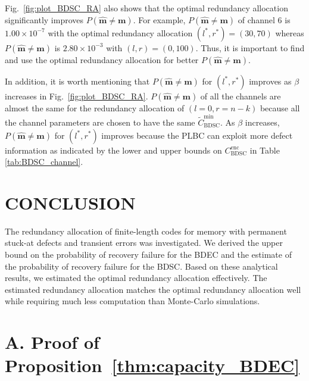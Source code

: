 \documentclass[10pt,twocolumn,twoside,submit]{JCNtran}
\begin{document}
	Fig.~\ref{fig:plot_BDSC_RA} also shows that the optimal redundancy allocation significantly improves $P\left( \widehat{\mathbf{m}} \ne \mathbf{m} \right)$. For example, $P\left( \widehat{\mathbf{m}} \ne \mathbf{m} \right)$ of channel 6 is $1.00 \times 10^{-7}$ with the optimal redundancy allocation $(l^*, r^*) = (30, 70)$ whereas $P\left( \widehat{\mathbf{m}} \ne \mathbf{m} \right)$ is $2.80 \times 10^{-3}$ with $(l, r) = (0, 100)$. Thus, it is important to find and use the optimal redundancy allocation for better $P\left( \widehat{\mathbf{m}} \ne \mathbf{m} \right)$.
	
	In addition, it is worth mentioning that $P\left( \widehat{\mathbf{m}} \ne \mathbf{m} \right)$ for $(l^*, r^*)$ improves as $\beta$ increases in Fig.~\ref{fig:plot_BDSC_RA}. $P\left( \widehat{\mathbf{m}} \ne \mathbf{m} \right)$ of all the channels are almost the same for the redundancy allocation of $\left(l=0, r=n-k\right)$ because all the channel parameters are chosen to have the same $\widetilde{C}_{\text{BDSC}}^{\text{min}}$. As $\beta$ increases, $P\left( \widehat{\mathbf{m}} \ne \mathbf{m} \right)$ for $(l^*, r^*)$ improves because the PLBC can exploit more defect information as indicated by the lower and upper bounds on $C_{\text{BDSC}}^{\text{enc}}$ in Table \ref{tab:BDSC_channel}. 

\section{\uppercase{Conclusion}} \label{sec:conclusion}

	The redundancy allocation of finite-length codes for memory with permanent stuck-at defects and transient errors was investigated. We derived the upper bound on the probability of recovery failure for the BDEC and the estimate of the probability of recovery failure for the BDSC. Based on these analytical results, we estimated the optimal redundancy allocation effectively. The estimated redundancy allocation matches the optimal redundancy allocation well while requiring much less computation than Monte-Carlo simulations.

\appendices

\section*{A. Proof of Proposition~\ref{thm:capacity_BDEC}\label{pf:capacity_BDEC}}
\end{document}
